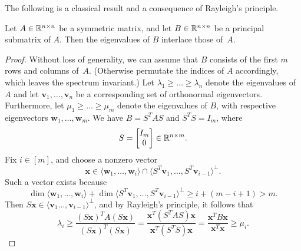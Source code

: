 The following is a classical result and a consequence of Rayleigh's principle.
\begin{proposition}
    Let $A \in \mathbb{R}^{n \times n}$ be a symmetric matrix, and let $B \in \mathbb{R}^{n \times n}$ be a principal submatrix of $A$. 
    Then the eigenvalues of $B$ interlace those \mbox{of $A$}.
\end{proposition}

\begin{proof}
    Without loss of generality, we can assume that $B$ consists of the first $m$ rows and columns \mbox{of $A$}. 
    (Otherwise permutate the indices of $A$ accordingly, which leaves the spectrum invariant.)
    Let $\lambda_1 \ge \dots \ge \lambda_n$ denote the eigenvalues of $A$ and let $\bm{v}_1, \dots, \bm{v}_n$ be a corresponding set of orthonormal eigenvectors.
    Furthermore, let $\mu_1 \ge \dots \ge \mu_m$ denote the eigenvalues of $B$, with respective eigenvectors $\bm{w}_1, \dots, \bm{w}_m$.
    We have $B = S^T A S$ and $S^T S = I_m$, where 
    \begin{equation*}
        S = \begin{bmatrix}
            I_m \\ 0
        \end{bmatrix} \in \mathbb{R}^{n \times m}.
    \end{equation*}
    Fix $i \in [m]$, and choose a nonzero vector 
    \begin{equation*}
        \bm{x} \in \langle \bm{w}_1, \dots, \bm{w}_i \rangle \cap \Big \langle S^T \bm{v}_1, \dots, S^T \bm{v}_{i - 1} \Big \rangle ^\perp.
    \end{equation*}
    Such a vector exists because %
    \begin{equation*}
        \dim \langle \bm{w}_1, \dots, \bm{w}_i \rangle + \dim \Big \langle S^T \bm{v}_1, \dots, S^T \bm{v}_{i - 1} \Big \rangle ^\perp \ge i + (m - i + 1) > m.
    \end{equation*}
    Then $S \bm x \in \langle \bm{v}_1 \dots, \bm{v}_{i - 1} \rangle^\perp$, and by Rayleigh's principle, it follows that 
    \begin{equation*}
        \lambda_i \ge \frac{(S \bm{x})^T A (S\bm{x})}{(S \bm{x})^T (S \bm{x})} 
            = \frac{\bm{x}^T (S^T A S) \bm{x}}{\bm{x}^T (S^T S) \bm{x}}
            = \frac{\bm{x}^T B \bm{x}}{\bm{x}^T \bm{x}} \ge \mu_i.
    \end{equation*}

\end{proof}
